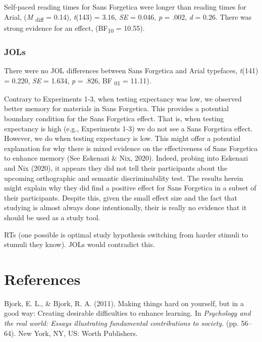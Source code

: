 \documentclass[
  english,
  man]{apa6}
\begin{document}
Self-paced reading times for Sans Forgetica were longer than reading times for Arial, (\emph{M} \textsubscript{diff} = 0.14), \emph{t}(143) = 3.16, \emph{SE} = 0.046, \emph{p} = .002, \emph{d} = 0.26. There was strong evidence for an effect, (BF\textsubscript{10} = 10.55).

\hypertarget{jols}{%
\subsubsection{JOLs}\label{jols}}

There were no JOL differences between Sans Forgetica and Arial typefaces, \emph{t}(141) = 0.220, \emph{SE} = 1.634, \emph{p} = .826, BF \textsubscript{01} = 11.11).

Contrary to Experiments 1-3, when testing expectancy was low, we observed better memory for materials in Sans Forgetica. This provides a potential boundary condition for the Sans Forgetica effect. That is, when testing expectancy is high (e.g., Experiments 1-3) we do not see a Sans Forgetica effect. However, we do when testing expectancy is low. This might offer a potential explanation for why there is mixed evidence on the effectiveness of Sans Forgetica to enhance memory (See Eskenazi \& Nix, 2020). Indeed, probing into Eskenazi and Nix (2020), it appears they did not tell their participants about the upcoming orthographic and semantic discriminability test. The results herein might explain why they did find a positive effect for Sans Forgetica in a subset of their participants. Despite this, given the small effect size and the fact that studying is almost always done intentionally, their is really no evidence that it should be used as a study tool.

RTs (one possible is optimal study hypothesis switching from harder stimuli to stumuli they know). JOLs would contradict this.

\newpage

\hypertarget{references}{%
\section{References}\label{references}}

\begingroup
\setlength{\parindent}{-0.5in}
\setlength{\leftskip}{0.5in}

\hypertarget{refs}{}
\leavevmode\hypertarget{ref-Bjork2011}{}%
Bjork, E. L., \& Bjork, R. A. (2011). Making things hard on yourself, but in a good way: Creating desirable difficulties to enhance learning. In \emph{Psychology and the real world: Essays illustrating fundamental contributions to society.} (pp. 56--64). New York, NY, US: Worth Publishers.
\end{document}
